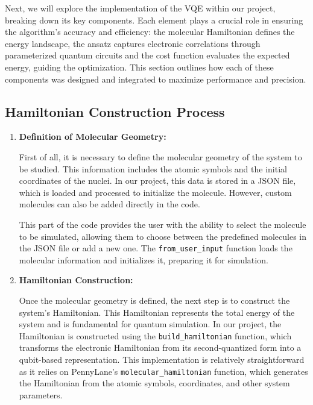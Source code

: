Next, we will explore the implementation of the VQE within our project, breaking down its key components. Each element plays a crucial role in ensuring the algorithm's accuracy and efficiency: the molecular Hamiltonian defines the energy landscape, the ansatz captures electronic correlations through parameterized quantum circuits and the cost function evaluates the expected energy, guiding the optimization. This section outlines how each of these components was designed and integrated to maximize performance and precision.

\subsection{Hamiltonian Construction Process}

\begin{enumerate}
    \item \textbf{Definition of Molecular Geometry:}

    First of all, it is necessary to define the molecular geometry of the system to be studied. This information includes the atomic symbols and the initial coordinates of the nuclei. In our project, this data is stored in a JSON file, which is loaded and processed to initialize the molecule. However, custom molecules can also be added directly in the code. 

    This part of the code provides the user with the ability to select the molecule to be simulated, allowing them to choose between the predefined molecules in the JSON file or add a new one. The \texttt{from\_user\_input} function loads the molecular information and initializes it, preparing it for simulation.

    \item \textbf{Hamiltonian Construction:}

    Once the molecular geometry is defined, the next step is to construct the system's Hamiltonian. This Hamiltonian represents the total energy of the system and is fundamental for quantum simulation. In our project, the Hamiltonian is constructed using the \texttt{build\_hamiltonian} function, which transforms the electronic Hamiltonian from its second-quantized form into a qubit-based representation. This implementation is relatively straightforward as it relies on PennyLane's \texttt{molecular\_hamiltonian} function, which generates the Hamiltonian from the atomic symbols, coordinates, and other system parameters.


\end{enumerate}
